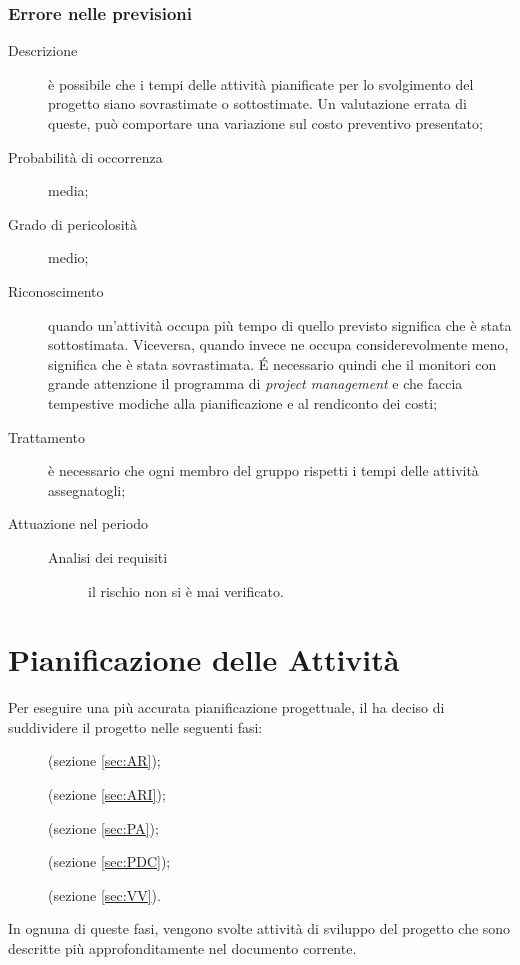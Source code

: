 		\subsubsection{Errore nelle previsioni}
		\begin{description}
			\item[Descrizione] è possibile che i tempi delle attività pianificate per lo svolgimento del progetto siano sovrastimate o sottostimate. Un valutazione errata di queste, può comportare una variazione sul costo preventivo presentato; 
			\item[Probabilità di occorrenza] media;
			\item[Grado di pericolosità] medio;
			\item[Riconoscimento] quando un'attività occupa più tempo di quello previsto significa che è stata sottostimata. Viceversa, quando invece ne occupa considerevolmente meno, significa che è stata sovrastimata. É necessario quindi che il \R{} monitori con grande attenzione il programma di \emph{project management} e che faccia tempestive modiche alla pianificazione e al rendiconto dei costi; 
			\item[Trattamento] è necessario che ogni membro del gruppo rispetti i tempi delle attività assegnatogli; 
			\item[Attuazione nel periodo]
			\begin{description}
				\item[Analisi dei requisiti]  il rischio non si è mai verificato.
			\end{description}
		\end{description}
\newpage \section{Pianificazione delle Attività} \label{sec:pianificazione}
Per eseguire una più accurata pianificazione progettuale, il  ha deciso di suddividere il progetto nelle seguenti fasi:
\begin{description}
	\item[\AR](sezione \ref{sec:AR});
	\item[\ARI](sezione \ref{sec:ARI});
	\item[\PA](sezione \ref{sec:PA});
	\item[\PDC](sezione \ref{sec:PDC});
	\item[\VV](sezione \ref{sec:VV}).
\end{description}
In ognuna di queste fasi, vengono svolte attività di sviluppo del progetto che sono descritte più approfonditamente nel documento corrente.

